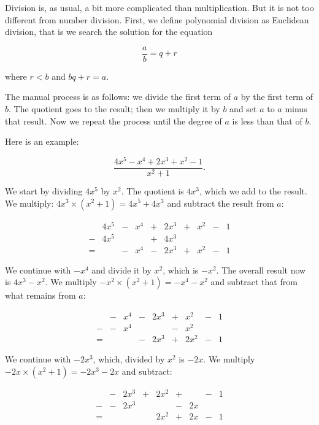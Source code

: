 \documentclass[tikz]{scrreprt}
\begin{document}
Division is, as usual, a bit more complicated than multiplication.
But it is not too different from number division. First,
we define polynomial division as Euclidean division, that is
we search the solution for the equation

\begin{equation}
\frac{a}{b} = q + r
\end{equation}

where $r < b$ and $bq+r=a$.

The manual process is as follows:
we divide the first term of $a$ by the first term of $b$.
The quotient goes to the result; then we multiply it by $b$
and set $a$ to $a$ minus that result.
Now we repeat the process
until the degree of $a$
is less than that of $b$.

Here is an example:

\[
\frac{4x^5 - x^4 + 2x^3 + x^2 - 1}{x^2 + 1}.
\]

We start by dividing $4x^5$ by $x^2$.
The quotient is $4x^3$, which we add to the result.
We multiply: $4x^3 \times (x^2 + 1) = 4x^5 + 4x^3$
and subtract the result from $a$:

\begin{equation}
\begin{array}{crcrcrcrcr}
  & 4x^5 & - &  x^4 & + & 2x^3 & + & x^2 & - & 1\\
- & 4x^5 &   &      & + & 4x^3 &   &     &   &  \\
= &      & - &  x^4 & - & 2x^3 & + & x^2 & - & 1
\end{array}
\end{equation}

We continue with
$-x^4$ and divide it by $x^2$, which is
$-x^2$. 
The overall result now is $4x^3 - x^2$.
We multiply $-x^2 \times (x^2 + 1) = -x^4 - x^2$
and subtract that from what remains from $a$:

\begin{equation}
\begin{array}{ccrcrcrcr}
  & - &  x^4 & - & 2x^3 & + &  x^2 & - & 1\\
- & - &  x^4 &   &      & - &  x^2 &   &  \\
= &   &      & - & 2x^3 & + & 2x^2 & - & 1
\end{array}
\end{equation}

We continue with $-2x^3$, which, divided by
$x^2$ is $-2x$. 
We multiply $-2x \times (x^2 + 1) = -2x^3 - 2x$
and subtract:

\begin{equation}
\begin{array}{ccrcrcrcr}
  & - & 2x^3 & + & 2x^2 & + &    & - & 1\\
- & - & 2x^3 &   &      & - & 2x &   &  \\
= &   &      &   & 2x^2 & + & 2x & - & 1 
\end{array}
\end{equation}
\end{document}
